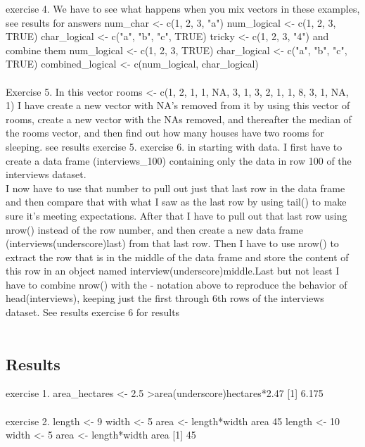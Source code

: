\documentclass{article}
\begin{document}
exercise 4. We have to see what happens when you mix vectors in these examples, see results for answers
num\_char \textless- c(1, 2, 3, "a")
 num\_logical \textless- c(1, 2, 3, TRUE)
 char\_logical \textless- c("a", "b", "c", TRUE)
 tricky \textless- c(1, 2, 3, "4")
 and combine them
 num\_logical \textless- c(1, 2, 3, TRUE)
char\_logical \textless- c("a", "b", "c", TRUE)
combined\_logical \textless- c(num\_logical, char\_logical)\\\\

Exercise 5. In this vector rooms \textless- c(1, 2, 1, 1, NA, 3, 1, 3, 2, 1, 1, 8, 3, 1, NA, 1) I have create a new vector with NA's removed from it by using this vector of rooms, create a new vector with the NAs removed, and thereafter the median of the rooms vector, and then find out how many houses have two rooms for sleeping. see results exercise 5.
exercise 6. in starting with data.
I first have to create a data frame (interviews\_100) containing only the data in row 100 of the interviews dataset.\\
I now have to use that number to pull out just that last row in the data frame and then compare that with what I saw as the last row by using tail() to make sure it’s meeting expectations. After that I have to pull out that last row using nrow() instead of the row number, and then create a new data frame (interviews(underscore)last) from that last row. Then I have to use nrow() to extract the row that is in the middle of the data frame and store the content of this row in an object named interview(underscore)middle.Last but not least I have to combine nrow() with the - notation above to reproduce the behavior of head(interviews), keeping just the first through 6th rows of the interviews dataset. See results exercise 6 for results\\\\

\subsection{Results} exercise 1. area\_hectares \textless- 2.5
\textgreater area(underscore)hectares*2.47
[1] 6.175\\\\

exercise 2. length \textless- 9
width \textless- 5
area \textless- length*width
area 45
length \textless- 10
width \textless- 5
area \textless- length*width
area [1] 45\\\\
\end{document}
